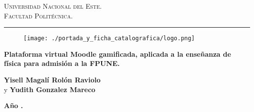 \documentclass[12pt,a4paper,oneside]{book}
\begin{document}
\renewcommand{\glossaryname}{Glosario}

\renewcommand\listtablename{\'Indice de Tablas}

\renewcommand{\tablename}{Tabla}
\renewcommand{\acronymname}{Acr\'onimos y s\'imbolos}
\renewcommand{\bibname}{Referencias bibliogr\'aficas}
\frontmatter
\vspace*{-3cm}

\thispagestyle{empty}

{\bf
\begin{center}
\large
\vspace*{-1 cm}\Large \textsc{Universidad Nacional del Este.} \\
\Large \textsc{Facultad Politécnica.} \\
\vspace*{0.5 cm}\hrule
\end{center}
}

\vspace*{-0.5 cm}
\begin{figure}[htb]
\begin{center}
\texttt{[image: ./portada\_y\_ficha\_catalografica/logo.png]}

\end{center}
\end{figure}


\vspace{3 cm}
{
\noindent
\begin{center}
\huge \bf Plataforma virtual Moodle gamificada, aplicada a la enseñanza de física para admisión a la FPUNE.
\end{center}
}


\vspace{6 cm}

\begin{center}
{\textbf{\Large Yisell Magalí Rolón Raviolo}\\[5mm]
\hspace{0.5 cm} y \textbf{\Large Yudith Gonzalez Mareco}
\vspace{0.5cm}

\textbf{Año \the\year.}}
\end{center}









\tableofcontents
\listoffigures
{}
\listoftables
{}
\printglossary[type=\acronymtype] %
{}
\mainmatter


% 
% 
% 
\end{document}
